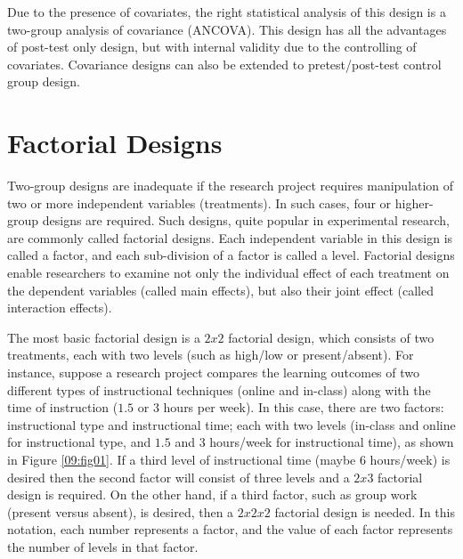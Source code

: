 Due to the presence of covariates, the right statistical analysis of this design is a two-group analysis of covariance (ANCOVA). This design has all the advantages of post-test only design, but with internal validity due to the controlling of covariates. Covariance designs can also be extended to pretest/post-test control group design.

\section{Factorial Designs}

Two-group designs are inadequate if the research project requires manipulation of two or more independent variables (treatments). In such cases, four or higher-group designs are required. Such designs, quite popular in experimental research, are commonly called factorial designs. Each independent variable in this design is called a factor, and each sub-division of a factor is called a level. Factorial designs enable researchers to examine not only the individual effect of each treatment on the dependent variables (called main effects), but also their joint effect (called interaction effects).

The most basic factorial design is a $ 2 x 2 $ factorial design, which consists of two treatments, each with two levels (such as high/low or present/absent). For instance, suppose a research project compares the learning outcomes of two different types of instructional techniques (online and in-class) along with the time of instruction ($ 1.5 $ or $ 3 $ hours per week). In this case, there are two factors: instructional type and instructional time; each with two levels (in-class and online for instructional type, and $ 1.5 $ and $ 3 $ hours/week for instructional time), as shown in Figure \ref{09:fig01}. If a third level of instructional time (maybe $ 6 $ hours/week) is desired then the second factor will consist of three levels and a $ 2 x 3 $ factorial design is required. On the other hand, if a third factor, such as group work (present versus absent), is desired, then a $ 2 x 2 x 2 $ factorial design is needed. In this notation, each number represents a factor, and the value of each factor represents the number of levels in that factor.

